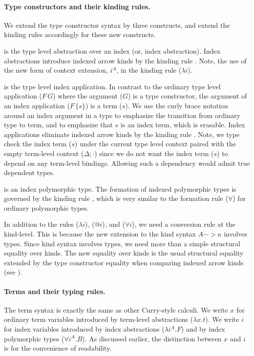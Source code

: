 \paragraph{Type constructors and their kinding rules.}
We extend the type constructor syntax by three constructs,
and extend the kinding rules accordingly for these new constructs.

 is the type level abstraction over an index
(or, index abstraction). Index abstractions introduce indexed arrow kinds
by the kinding rule . Note, the use of the new form of context
extension, $i^A$, in the kinding rule ($\lambda i$).


 is the type level index application. In contrast to
the ordinary type level application ($F\,G$) where the argument ($G$) is
a type constructor, the argument of an index application ($F\,\{s\}$) is
a term ($s$). We use the curly brace notation around an index argument in a type to
emphasize the transition from ordinary type to term, and to emphasize
that $s$ is an index term, which is erasable. Index applications eliminate
indexed arrow kinds by the kinding rule . Note, we type check
the index term ($s$) under the current type level context paired with
the empty term-level context ($\Delta;\cdot$) since we do not want
the index term ($s$) to depend on any term-level bindings. Allowing such
a dependency would admit true dependent types.

 is an index polymorphic type.
The formation of indexed polymorphic types is governed by
the kinding rule , which is very similar to
the formation rule ($\forall$) for ordinary polymorphic types.

In addition to the rules ($\lambda i$), ($@ i$), and ($\forall i$),
we need a conversion rule  at the kind-level. This is because
the new extension to the kind syntax $A -> \kappa$ involves types.
Since kind syntax involves types, we need more than a simple
structural equality over kinds. The new equality over kinds is
the usual structural equality extended by the type constructor equality
when comparing indexed arrow kinds (see ).

\paragraph{Terms and their typing rules.}
The term syntax is exactly the same as other Curry-style calculi.
We write $x$ for ordinary term variables introduced by
term-level abstractions ($\lambda x.t$).
We write $i$ for index variables introduced by
index abstractions ($\lambda i^A.F$) and by
index polymorphic types ($\forall i^A.B$). As discussed earlier, the distinction between
$x$ and $i$ is for the convenience of readability.

